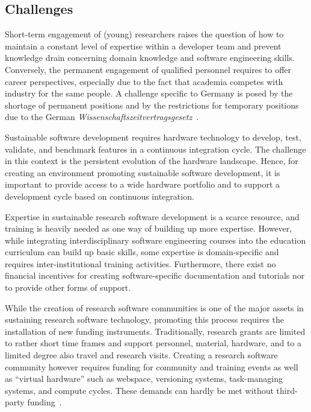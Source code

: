 \documentclass[a4paper,num-refs,numbers,sort&compress]{de-rse}
\begin{document}
\subsection{Challenges}
Short-term engagement of (young) researchers raises the question of how to maintain a
constant level of expertise within a developer team and prevent knowledge drain concerning domain knowledge and software engineering skills.
Conversely, the permanent engagement of qualified personnel requires to offer career perspectives, especially due to the fact that academia competes with
industry for the same people. A challenge specific to Germany is posed by the
shortage of permanent positions and by the restrictions for temporary positions
due to the German \emph{Wissenschaftszeitvertragsgesetz}~\cite{BMJVarbeit}.

Sustainable software development requires hardware technology to develop, test, validate, and benchmark features in a continuous integration cycle. The challenge in this context is the persistent evolution of the hardware landscape. Hence, for creating an environment promoting sustainable software development, it is important to provide access to a wide hardware portfolio and to support a development cycle based on continuous integration.

Expertise in sustainable research software development is a scarce resource, and training is heavily needed as one way of building up more expertise. However, while integrating interdisciplinary software engineering courses into the education curriculum can build up basic skills, some expertise is domain-specific and requires inter-institutional training activities. Furthermore, there exist no financial incentives for creating software-specific documentation and tutorials nor to provide other forms of support.

While the creation of research software communities is one of the major assets in sustaining research software technology, promoting this process requires the installation of new funding instruments. Traditionally, research grants are limited to rather short time frames and support personnel, material, hardware, and to a limited degree also travel and research visits. Creating a research software community however requires funding for community and training events as well as ``virtual hardware'' such as webspace, versioning systems, task-managing systems, and compute cycles. These demands can hardly be met without third-party funding~\cite{Kuchinke2016,chang2007open,Aartsen2018,Gabella2018}.
\end{document}
